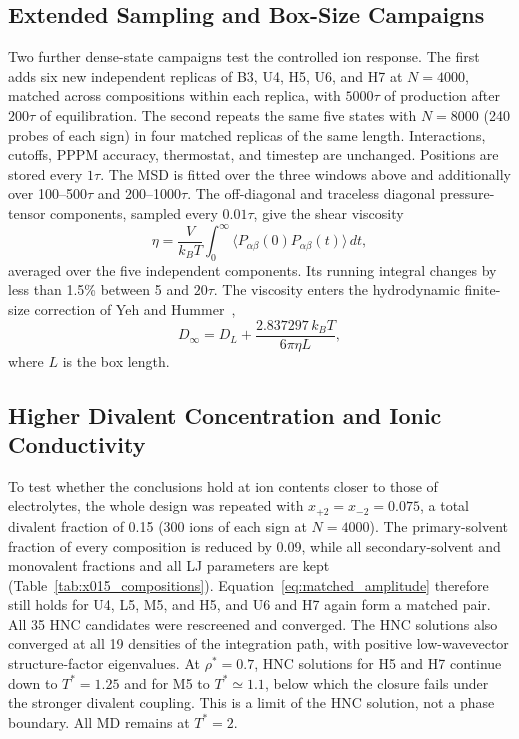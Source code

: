 \documentclass[aps,pre,twocolumn,superscriptaddress,floatfix]{revtex4-2}
\begin{document}
\subsection{Extended Sampling and Box-Size Campaigns}
\label{sec:followup_methods}

Two further dense-state campaigns test the controlled ion response. The first adds six new independent replicas of B3, U4, H5, U6, and H7 at $N=4000$, matched across compositions within each replica, with $5000\tau$ of production after $200\tau$ of equilibration. The second repeats the same five states with $N=8000$ (240 probes of each sign) in four matched replicas of the same length. Interactions, cutoffs, PPPM accuracy, thermostat, and timestep are unchanged. Positions are stored every $1\tau$. The MSD is fitted over the three windows above and additionally over 100--500$\tau$ and 200--1000$\tau$. The off-diagonal and traceless diagonal pressure-tensor components, sampled every $0.01\tau$, give the shear viscosity
\begin{equation}
\eta=\frac{V}{k_BT}\int_0^\infty\langle P_{\alpha\beta}(0)P_{\alpha\beta}(t)\rangle\,dt,
\label{eq:gk_viscosity}
\end{equation}
averaged over the five independent components. Its running integral changes by less than 1.5\% between 5 and $20\tau$. The viscosity enters the hydrodynamic finite-size correction of Yeh and Hummer~\cite{YehHummer2004},
\begin{equation}
D_\infty=D_L+\frac{2.837297\,k_BT}{6\pi\eta L},
\label{eq:yeh_hummer}
\end{equation}
where $L$ is the box length.

\subsection{Higher Divalent Concentration and Ionic Conductivity}
\label{sec:x015_methods}

To test whether the conclusions hold at ion contents closer to those of electrolytes, the whole design was repeated with $x_{+2}=x_{-2}=0.075$, a total divalent fraction of 0.15 (300 ions of each sign at $N=4000$). The primary-solvent fraction of every composition is reduced by 0.09, while all secondary-solvent and monovalent fractions and all LJ parameters are kept (Table~\ref{tab:x015_compositions}). Equation~\eqref{eq:matched_amplitude} therefore still holds for U4, L5, M5, and H5, and U6 and H7 again form a matched pair. All 35 HNC candidates were rescreened and converged. The HNC solutions also converged at all 19 densities of the integration path, with positive low-wavevector structure-factor eigenvalues. At $\rho^*=0.7$, HNC solutions for H5 and H7 continue down to $T^*=1.25$ and for M5 to $T^*\simeq1.1$, below which the closure fails under the stronger divalent coupling. This is a limit of the HNC solution, not a phase boundary. All MD remains at $T^*=2$.
\end{document}
